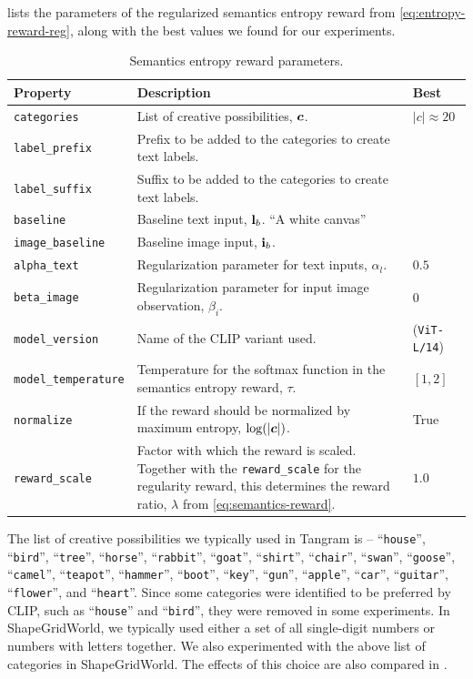  lists the parameters of the regularized semantics entropy reward from \eqref{eq:entropy-reward-reg}, along with the best values we found for our experiments.
\begin{table}[H]
    \centering
    \caption{Semantics entropy reward parameters.}
    \begin{tabularx}{\textwidth}{C{3.9cm} L C{2cm}}
        \hline
        Property & Description & Best\\
        \hline
        \texttt{categories} & List of creative possibilities, \(\bm{c}\). & \(|c| \approx 20\)\\
        \texttt{label\_prefix} & Prefix to be added to the categories to create text labels.\\
        \texttt{label\_suffix} & Suffix to be added to the categories to create text labels.\\
        \texttt{baseline} & Baseline text input, \(\mathbf{l}_b\). ``A white canvas''\\
        \texttt{image\_baseline} & Baseline image input, \(\mathbf{i}_b\).\\
        \texttt{alpha\_text} & Regularization parameter for text inputs, \(\alpha_{l}\). & \(0.5\)\footnotemark[1]\\
        \texttt{beta\_image} & Regularization parameter for input image observation, \(\beta_{i}\). & \(0\)\footnotemark[1]\\
        \texttt{model\_version} & Name of the CLIP variant used. & (\texttt{ViT-L/14})\\
        \texttt{model\_temperature} & Temperature for the softmax function in the semantics entropy reward, \(\tau\). & \([1, 2]\)\\
        \texttt{normalize} & If the reward should be normalized by maximum entropy, \(\log(|\bm{c}|)\). & True\\
        \texttt{reward\_scale} & Factor with which the reward is scaled. Together with the \texttt{reward\_scale} for the regularity reward, this determines the reward ratio, \(\lambda\) from \eqref{eq:semantics-reward}. & \(1.0\)\\
        \hline
    \end{tabularx}
    \label{tab:entropy-reward-params}
\end{table}

The list of creative possibilities we typically used in Tangram is -- ``\texttt{house}'', ``\texttt{bird}'', ``\texttt{tree}'', ``\texttt{horse}'', ``\texttt{rabbit}'', ``\texttt{goat}'', ``\texttt{shirt}'', ``\texttt{chair}'', ``\texttt{swan}'', ``\texttt{goose}'', ``\texttt{camel}'', ``\texttt{teapot}'', ``\texttt{hammer}'', ``\texttt{boot}'', ``\texttt{key}'', ``\texttt{gun}'', ``\texttt{apple}'', ``\texttt{car}'', ``\texttt{guitar}'', ``\texttt{flower}'', and ``\texttt{heart}''.
Since some categories were identified to be preferred by CLIP, such as ``\texttt{house}'' and ``\texttt{bird}'', they were removed in some experiments.
In ShapeGridWorld, we typically used either a set of all single-digit numbers or numbers with letters together.
We also experimented with the above list of categories in ShapeGridWorld.
The effects of this choice are also compared in .


